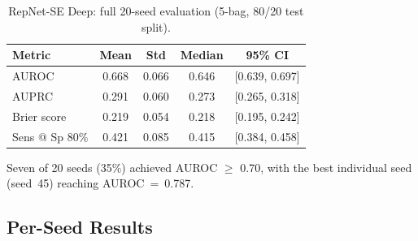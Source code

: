 \documentclass[11pt,a4paper]{article}
\begin{document}
\begin{table}[H]
\centering
\caption{RepNet-SE Deep: full 20-seed evaluation (5-bag, 80/20 test split).}
\label{tab:full_results}
\begin{tabular}{lcccc}
\toprule
\textbf{Metric} & \textbf{Mean} & \textbf{Std} & \textbf{Median} & \textbf{95\% CI} \\
\midrule
AUROC & 0.668 & 0.066 & 0.646 & [0.639, 0.697] \\
AUPRC & 0.291 & 0.060 & 0.273 & [0.265, 0.318] \\
Brier score & 0.219 & 0.054 & 0.218 & [0.195, 0.242] \\
Sens @ Sp 80\% & 0.421 & 0.085 & 0.415 & [0.384, 0.458] \\
\bottomrule
\end{tabular}
\end{table}

Seven of 20 seeds (35\%) achieved AUROC $\geq$ 0.70, with the best individual seed (seed~45) reaching AUROC~=~0.787.

\subsection{Per-Seed Results}
\end{document}
